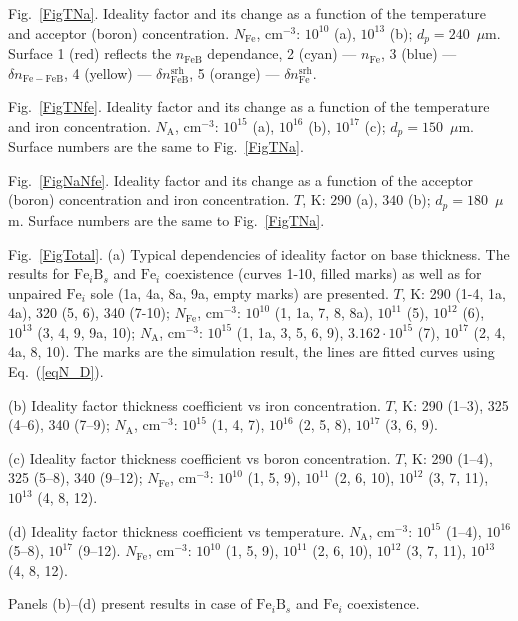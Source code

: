 \documentclass[12pt]{article}
\begin{document}
 Fig.~\ref{FigTNa}.
Ideality factor and its change as a function of the temperature and acceptor (boron) concentration.
$N_\mathrm{Fe}$, cm$^{-3}$: $10^{10}$ (a), $10^{13}$ (b);
$d_p=240$~$\mu$m.
Surface 1 (red) reflects the  $n_\mathrm{FeB}$ dependance,
2 (cyan) ---  $n_\mathrm{Fe}$,
3 (blue) --- $\delta n_\mathrm{Fe-FeB}$,
4 (yellow) --- $\delta n_\mathrm{FeB}^\mathrm{srh}$,
5 (orange) --- $\delta n_\mathrm{Fe}^\mathrm{srh}$.


 Fig.~\ref{FigTNfe}.
Ideality factor and its change as a function of the temperature and iron concentration.
$N_\mathrm{A}$, cm$^{-3}$: $10^{15}$ (a), $10^{16}$ (b), $10^{17}$ (c);
$d_p=150$~$\mu$m.
Surface numbers are the same to Fig.~\ref{FigTNa}.

 Fig.~\ref{FigNaNfe}.
Ideality factor and its change as a function of the acceptor (boron) concentration and iron concentration.
$T$, K: $290$ (a), $340$ (b);
$d_p=180$~$\mu$m.
Surface numbers are the same to Fig.~\ref{FigTNa}.


 Fig.~\ref{FigTotal}.
(a) Typical dependencies of ideality factor on base thickness.
The results for $\mathrm{Fe}_i\mathrm{B}_s$ and $\mathrm{Fe}_i$ coexistence (curves 1-10, filled marks)
as well as for unpaired $\mathrm{Fe}_i$ sole (1a, 4a, 8a, 9a, empty marks) are presented.
$T$, K: 290 (1-4, 1a, 4a), 320 (5, 6), 340 (7-10);
$N_\mathrm{Fe}$, cm$^{-3}$: $10^{10}$ (1, 1a, 7, 8, 8a), $10^{11}$ (5), $10^{12}$ (6), $10^{13}$ (3, 4, 9, 9a, 10);
$N_\mathrm{A}$, cm$^{-3}$: $10^{15}$ (1, 1a, 3, 5, 6, 9), $3.162\cdot10^{15}$ (7),  $10^{17}$ (2, 4, 4a, 8, 10).
The marks are the simulation result,
the lines are fitted curves using Eq.~(\ref{eqN_D}).

(b) Ideality factor thickness coefficient vs iron concentration.
$T$, K: 290 (1--3), 325 (4--6), 340 (7--9);
$N_\mathrm{A}$, cm$^{-3}$: $10^{15}$ (1, 4, 7), $10^{16}$ (2, 5, 8),  $10^{17}$ (3, 6, 9).

(c) Ideality factor thickness coefficient vs boron concentration.
$T$, K: 290 (1--4), 325 (5--8), 340 (9--12);
$N_\mathrm{Fe}$, cm$^{-3}$: $10^{10}$ (1, 5, 9), $10^{11}$ (2, 6, 10),  $10^{12}$ (3, 7, 11), $10^{13}$ (4, 8, 12).

(d) Ideality factor thickness coefficient vs temperature.
$N_\mathrm{A}$, cm$^{-3}$: $10^{15}$ (1--4), $10^{16}$ (5--8),  $10^{17}$ (9--12).
$N_\mathrm{Fe}$, cm$^{-3}$: $10^{10}$ (1, 5, 9), $10^{11}$ (2, 6, 10),  $10^{12}$ (3, 7, 11), $10^{13}$ (4, 8, 12).

Panels (b)--(d) present results in  case of $\mathrm{Fe}_i\mathrm{B}_s$ and $\mathrm{Fe}_i$ coexistence.
\end{document}
